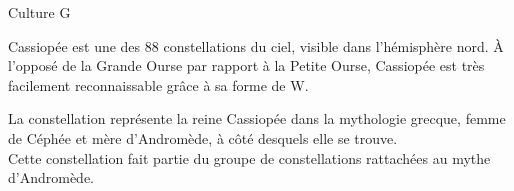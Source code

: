 \begin{exercice*}
    \begin{changemargin}{-10mm}{-10mm}
    \begin{myBox}{ Culture G}
        \begin{flushleft}
            Cassiopée est une des 88 constellations du ciel, visible dans
            l'hémisphère nord. À l'opposé de la Grande Ourse par rapport à la 
            Petite Ourse, Cassiopée est très facilement reconnaissable grâce à 
            sa forme de \og W\fg.\par
            La constellation représente la reine Cassiopée dans la mythologie
            grecque, femme de Céphée et mère d'Andromède, à côté desquels elle se
            trouve.\\
            Cette constellation fait partie du groupe de constellations rattachées au mythe d'Andromède.
        \end{flushleft}
        {\tiny {}}
    \end{myBox}
    \end{changemargin}


\end{exercice*}
